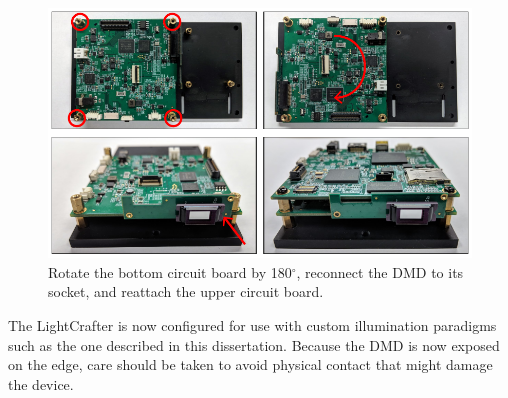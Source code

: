 \begin{figure}
    \includegraphics{figures/appendix_b/dmd_mod_6.pdf}
    \caption {
        \label{fig:dmd_mod_6}
        Rotate the bottom circuit board by 180$^\circ$, reconnect the DMD to its socket, and reattach the upper circuit board.
    }
\end{figure}

The LightCrafter\texttrademark{} is now configured for use with custom illumination paradigms such as the one described in this dissertation. Because the DMD is now exposed on the edge, care should be taken to avoid physical contact that might damage the device.




